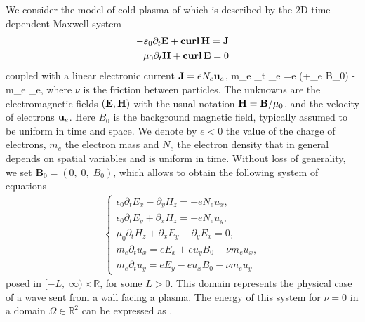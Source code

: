 We consider the model of cold plasma of \cite{Stix} which is described by the 2D time-dependent Maxwell system  
\begin{align}
-\varepsilon_0 \partial_t {\bf E} + {\bf curl}\, {\bf H} = {\bf J}\\
\mu_0 \partial_t {\bf H} + {\bf curl}\, {\bf E} = 0
\end{align}
coupled with a linear electronic current  ${\bf J} = eN_e {\bf u}_e$, 
\be
m_e \partial_t \ubf_e =e (\E +\ubf_e \wedge B_0) -m_e \nu \ubf_e, \label{eq:electronmove}
\ee
where $\nu$ is  the friction  between particles.
The unknowns are the electromagnetic fields $({\bf E},{\bf H})$ with the usual notation ${\bf H} = {\bf B}/\mu_0$, 
and the velocity of electrons ${\bf u}_e$. Here $B_0$ is the background magnetic field, typically assumed to be uniform in time and space.  
We denote by $e<0$ the value of the charge of electrons, $m_e$ the electron mass and $N_e$ the electron density that in general 
depends on spatial variables and is uniform in time. 
Without loss of generality, we set $\mathbf{B}_0=\left(0,\; 0,\; B_0\right)$, which allows to obtain the following system of equations 
\begin{align}
\label{eq:main_model}
\left\{\begin{array}{l}
\epsilon_0\partial_t E_{x}-\partial_y H_z=-eN_e u_x,\\
\epsilon_0\partial_t E_{y}+\partial_x H_z=-eN_e u_y,\\
\mu_0\partial_t H_z+\partial_x E_y-\partial_y E_x=0,\\
m_e\partial_t u_x=eE_x+eu_yB_0-\nu m_e u_x,\\
m_e\partial_t u_y=eE_y-eu_xB_0-\nu m_e u_y
\end{array}
\right.\end{align}
posed in $[-L,\; \infty)\times \mathbb{R}$, for some $L>0$. This domain represents the physical case of a wave sent from a wall facing a plasma. 
The energy of this system for $\nu=0$ in a domain $\Omega\in\mathbb R^2$ can be expressed as \cite{stable_yee_plasma_current}
.

